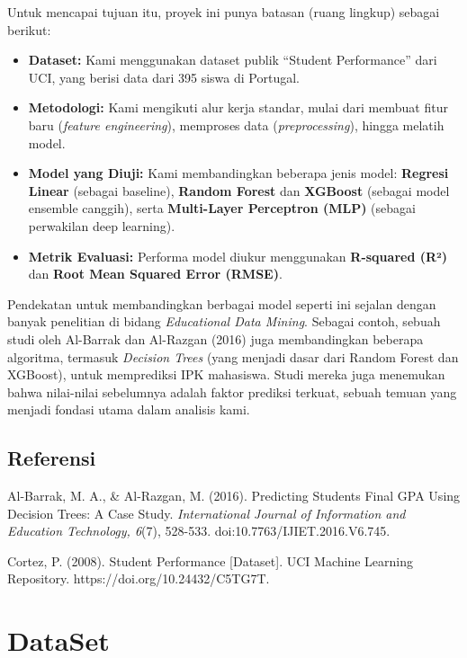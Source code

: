 Untuk mencapai tujuan itu, proyek ini punya batasan (ruang lingkup) sebagai berikut:
\begin{itemize}
    \item \textbf{Dataset:} Kami menggunakan dataset publik ``Student Performance'' dari UCI, yang berisi data dari 395 siswa di Portugal.
    \item \textbf{Metodologi:} Kami mengikuti alur kerja standar, mulai dari membuat fitur baru (\textit{feature engineering}), memproses data (\textit{preprocessing}), hingga melatih model.
    \item \textbf{Model yang Diuji:} Kami membandingkan beberapa jenis model: \textbf{Regresi Linear} (sebagai baseline), \textbf{Random Forest} dan \textbf{XGBoost} (sebagai model ensemble canggih), serta \textbf{Multi-Layer Perceptron (MLP)} (sebagai perwakilan deep learning).
    \item \textbf{Metrik Evaluasi:} Performa model diukur menggunakan \textbf{R-squared (R²)} dan \textbf{Root Mean Squared Error (RMSE)}.
\end{itemize}

Pendekatan untuk membandingkan berbagai model seperti ini sejalan dengan banyak penelitian di bidang \textit{Educational Data Mining}. Sebagai contoh, sebuah studi oleh Al-Barrak dan Al-Razgan (2016) juga membandingkan beberapa algoritma, termasuk \textit{Decision Trees} (yang menjadi dasar dari Random Forest dan XGBoost), untuk memprediksi IPK mahasiswa. Studi mereka juga menemukan bahwa nilai-nilai sebelumnya adalah faktor prediksi terkuat, sebuah temuan yang menjadi fondasi utama dalam analisis kami.

\section*{Referensi}
Al-Barrak, M. A., \& Al-Razgan, M. (2016). Predicting Students Final GPA Using Decision Trees: A Case Study. \textit{International Journal of Information and Education Technology, 6}(7), 528-533. doi:10.7763/IJIET.2016.V6.745.

\vspace{0.2cm}

Cortez, P. (2008). Student Performance [Dataset]. UCI Machine Learning Repository. https://doi.org/10.24432/C5TG7T.

\chapter*{DataSet}

